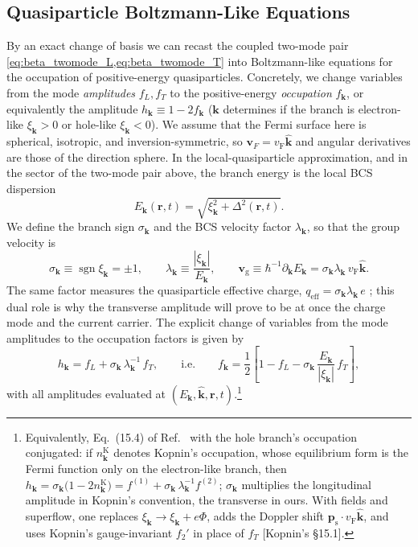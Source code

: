 \documentclass[
  aps,
  prb,
  preprint,
  superscriptaddress,
  longbibliography,
  nofootinbib
]{revtex4-2}
\newcommand{\br}{\mathbf{r}}
\newcommand{\bk}{\mathbf{k}}
\newcommand{\bv}{\mathbf{v}}
\newcommand{\vF}{v_{\mathrm{F}}}
\newcommand{\fL}{f_L}
\newcommand{\fT}{f_T}
\newcommand{\bps}{\mathbf{p}_{\mathrm{s}}}
\newcommand{\bvg}{\mathbf{v}_{\mathrm{g}}}
\begin{document}
\subsection{Quasiparticle Boltzmann-Like Equations}
By an exact change of basis we can recast the coupled two-mode pair \cref{eq:beta_twomode_L,eq:beta_twomode_T} into Boltzmann-like equations for the occupation of
positive-energy quasiparticles.
Concretely, we change variables from the mode \textit{amplitudes} \(\fL,\fT\) to the positive-energy \textit{occupation} \(f_{\bk}\), or equivalently the amplitude \(h_{\bk}\equiv1-2f_{\bk}\) (\( \bk \) determines if the branch is electron-like \(\xi_{\bk}>0\) or hole-like \(\xi_{\bk}<0\)).
We assume that the Fermi surface here is spherical, isotropic, and inversion-symmetric, so \(\bv_F=\vF\hat{\bk}\) and angular
derivatives are those of the direction sphere. In the
local-quasiparticle approximation, and in the sector of the two-mode
pair above, the branch energy is the local BCS dispersion
\begin{equation}
  E_{\bk}(\br,t) = \sqrt{\xi_{\bk}^{2}+\Delta^{2}(\br,t)}.
  \label{eq:beta_qp_energy}
\end{equation}
We define the branch sign \(\sigma_{\bk}\) and the BCS velocity factor
\(\lambda_{\bk}\), so that the group velocity is
\begin{equation}
  \sigma_{\bk} \equiv \operatorname{sgn}\xi_{\bk} = \pm1,
  \qquad
  \lambda_{\bk} \equiv \frac{|\xi_{\bk}|}{E_{\bk}},
  \qquad
  \bvg \equiv \hbar^{-1}\partial_{\bk}E_{\bk}
  = \sigma_{\bk}\lambda_{\bk}\,\vF\hat{\bk}.
  \label{eq:beta_sigma_lambda}
\end{equation}
The same factor measures the quasiparticle effective charge, \(q_{\mathrm{eff}}=\sigma_{\bk}\lambda_{\bk}\,e\) \cite{tinkham2004}; this dual role is why the transverse amplitude will prove to be at once the charge mode and the current carrier.
The explicit change of variables from the mode amplitudes to the occupation factors is given by
\begin{equation}
  h_{\bk}
  = \fL + \sigma_{\bk}\,\lambda_{\bk}^{-1}\,\fT,
  \qquad\text{i.e.}\qquad
  f_{\bk}
  = \frac12\!\left[
    1 - \fL
    - \sigma_{\bk}\,\frac{E_{\bk}}{|\xi_{\bk}|}\,\fT
  \right],
  \label{eq:beta_f_from_modes}
\end{equation}
with all amplitudes
evaluated at \((E_{\bk},\hat{\bk},\br,t)\).\footnote{Equivalently, Eq.~(15.4) of
Ref.~ with the hole branch's occupation
conjugated: if \(n_{\bk}^{\mathrm K}\) denotes Kopnin's occupation,
whose equilibrium form is the Fermi function only on the electron-like
branch, then
\(h_{\bk}=\sigma_{\bk}\bigl(1-2n_{\bk}^{\mathrm K}\bigr)
=f^{(1)}+\sigma_{\bk}\,\lambda_{\bk}^{-1}f^{(2)}\); \(\sigma_{\bk}\) multiplies
the longitudinal amplitude in Kopnin's convention, the transverse in
ours. With fields and superflow, one replaces
\(\xi_{\bk}\to\xi_{\bk}+e\Phi\), adds the Doppler shift
\(\bps\cdot\vF\hat{\bk}\), and uses Kopnin's gauge-invariant \(f_2'\)
in place of \(\fT\) [Kopnin's \S15.1].}
\end{document}
